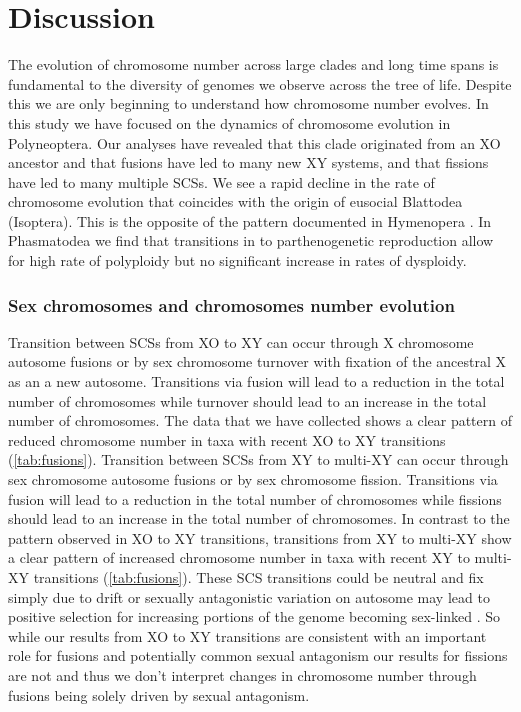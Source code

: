 \section{Discussion}

The evolution of chromosome number across large clades and long time spans is fundamental to the diversity of genomes we observe across the tree of life.
Despite this we are only beginning to understand how chromosome number evolves.
In this study we have focused on the dynamics of chromosome evolution in Polyneoptera. 
Our analyses have revealed that this clade originated from an XO ancestor and that fusions have led to many new XY systems, and that fissions have led to many multiple SCSs.
We see a rapid decline in the rate of chromosome evolution that coincides with the origin of eusocial Blattodea (Isoptera).
This is the opposite of the pattern documented in Hymenopera \citep{ross2015}.
In Phasmatodea we find that transitions in to parthenogenetic reproduction allow for high rate of polyploidy but no significant increase in rates of dysploidy.

\subsubsection{Sex chromosomes and chromosomes number evolution}
Transition between SCSs from XO to XY can occur through X chromosome autosome fusions or by sex chromosome turnover with fixation of the ancestral X as an a new autosome.
Transitions via fusion will lead to a reduction in the total number of chromosomes while turnover should lead to an increase in the total number of chromosomes.
The data that we have collected shows a clear pattern of reduced chromosome number in taxa with recent XO to XY transitions (\cref{tab:fusions}).
Transition between SCSs from XY to multi-XY can occur through sex chromosome autosome fusions or by sex chromosome fission.
Transitions via fusion will lead to a reduction in the total number of chromosomes while fissions should lead to an increase in the total number of chromosomes.
In contrast to the pattern observed in XO to XY transitions, transitions from XY to multi-XY show a clear pattern of increased chromosome number in taxa with recent XY to multi-XY transitions (\cref{tab:fusions}).
These SCS transitions could be neutral and fix simply due to drift or sexually antagonistic variation on autosome may lead to positive selection for increasing portions of the genome becoming sex-linked \citep{charlesworth1980, kitano2012}.
So while our results from XO to XY transitions are consistent with an important role for fusions and potentially common sexual antagonism our results for fissions are not and thus we don't interpret changes in chromosome number through fusions being solely driven by sexual antagonism. 

